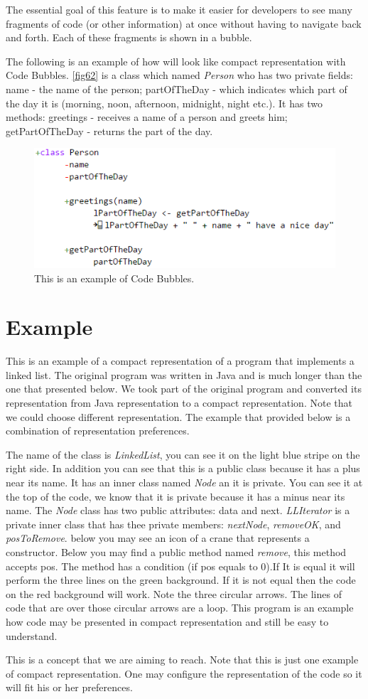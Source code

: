 The essential goal of this feature is to make it easier for developers to see many fragments of code (or other information) at once without having to navigate back and forth. Each of these fragments is shown in a bubble.

The following is an example of how will look like compact representation with Code Bubbles. \autoref{fig62} is a class which named \textit{Person} who has two private fields: name - the name of the person; partOfTheDay - which indicates which part of the day it is (morning, noon, afternoon, midnight, night etc.). It has two methods: greetings - receives a name of a person and greets him; getPartOfTheDay - returns the part of the day.
\begin{figure}[H]
	\includegraphics{"./fig/Code Bubbles"}
	\caption{This is an example of Code Bubbles.}
	\label{fig62}
\end{figure}

\section{Example} \label{section: Example}
This is an example of a compact representation  of a program that implements a linked list. The original program was written in Java and is much longer than the one that presented below. We took part of the original program and converted its representation from Java representation to a compact representation. Note that we could choose different representation. The example that provided below is a combination of representation preferences.

The name of the class is \textit{LinkedList}, you can see it on the light blue stripe on the right side. In addition you can see that this is a public class because it has a plus near its name. It has an inner class named \textit{Node} an it is private. You can see it at the top of the code, we know that it is private because it has a minus near its name. The \textit{Node} class has two public attributes: data and next. \textit{LLIterator} is a private inner class that has thee private members: \textit{nextNode}, \textit{removeOK}, and \textit{posToRemove}. below you may see an icon of a crane that represents a constructor. Below you may find a public method named \textit{remove}, this method accepts pos. The method has a condition (if pos equals to 0).If  It is equal it will perform the three lines on the green background. If it is not equal then the code on the red background will work. Note the three circular arrows. The lines of code that are over those circular arrows are a loop. This program is an example how code may be presented in compact representation and still be easy to understand.

This is a concept that we are aiming to reach. Note that this is just one example of compact representation. One may configure the representation of the code so it will fit his or her preferences.

